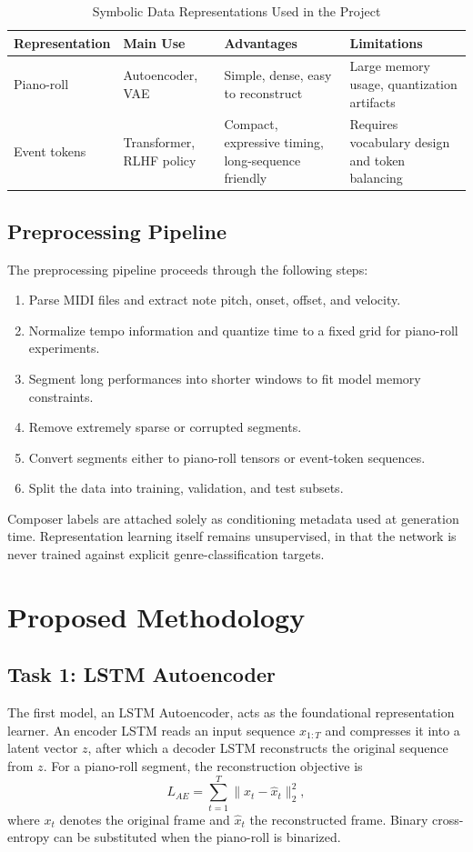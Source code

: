 \documentclass[conference]{IEEEtran}
\begin{document}
\begin{table}[ht]
\centering
\caption{Symbolic Data Representations Used in the Project}
\begin{tabular}{|l|l|l|l|}
\hline
\textbf{Representation} & \textbf{Main Use} & \textbf{Advantages} & \textbf{Limitations} \\ \hline
Piano-roll & Autoencoder, VAE & Simple, dense, easy to reconstruct & Large memory usage, quantization artifacts \\ \hline
Event tokens & Transformer, RLHF policy & Compact, expressive timing, long-sequence friendly & Requires vocabulary design and token balancing \\ \hline
\end{tabular}
\end{table}

\subsection{Preprocessing Pipeline}
The preprocessing pipeline proceeds through the following steps:
\begin{enumerate}
\item Parse MIDI files and extract note pitch, onset, offset, and velocity.
\item Normalize tempo information and quantize time to a fixed grid for piano-roll experiments.
\item Segment long performances into shorter windows to fit model memory constraints.
\item Remove extremely sparse or corrupted segments.
\item Convert segments either to piano-roll tensors or event-token sequences.
\item Split the data into training, validation, and test subsets.
\end{enumerate}

Composer labels are attached solely as conditioning metadata used at generation time. Representation learning itself remains unsupervised, in that the network is never trained against explicit genre-classification targets.

\section{Proposed Methodology}
\subsection{Task 1: LSTM Autoencoder}
The first model, an LSTM Autoencoder, acts as the foundational representation learner. An encoder LSTM reads an input sequence $x_{1:T}$ and compresses it into a latent vector $z$, after which a decoder LSTM reconstructs the original sequence from $z$. For a piano-roll segment, the reconstruction objective is
\begin{equation}
L_{AE} = \sum_{t=1}^{T} \|x_t - \hat{x}_t\|_2^2,
\end{equation}
where $x_t$ denotes the original frame and $\hat{x}_t$ the reconstructed frame. Binary cross-entropy can be substituted when the piano-roll is binarized.
\end{document}
